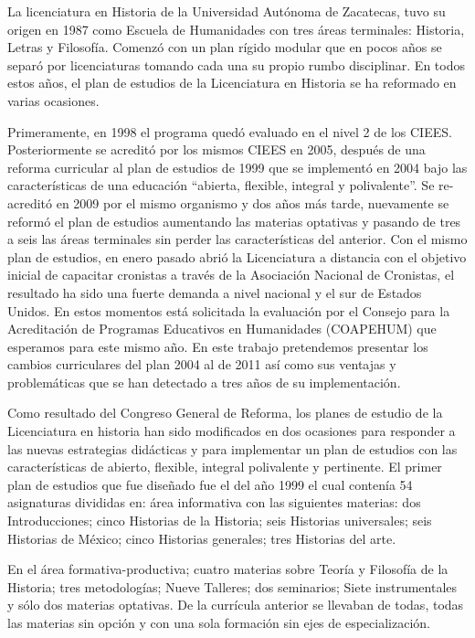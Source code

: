 \bigskip 
La licenciatura en Historia de la Universidad Autónoma de 
Zacatecas, tuvo su origen en 1987 como Escuela de Humanidades con tres 
áreas terminales: Historia, Letras y Filosofía. Comenzó con un plan 
rígido modular que en pocos años se separó por licenciaturas tomando 
cada una su propio rumbo disciplinar. En todos estos años, el plan de 
estudios de la Licenciatura en Historia se ha reformado en varias 
ocasiones.

Primeramente, en 1998 el programa quedó evaluado en el nivel 2 de los 
CIEES. Posteriormente se acreditó por los mismos CIEES en 2005, después 
de una reforma curricular al plan de estudios de 1999 que se implementó 
en 2004 bajo las características de una educación “abierta, flexible, 
integral y polivalente”. Se re-acreditó en 2009 por el mismo organismo 
y dos años más tarde, nuevamente se reformó el plan de estudios 
aumentando las materias optativas y pasando de tres a seis las áreas 
terminales sin perder las características del anterior. Con el mismo 
plan de estudios, en enero pasado abrió la Licenciatura a distancia con 
el objetivo inicial de capacitar cronistas a través de la Asociación 
Nacional de Cronistas, el resultado ha sido una fuerte demanda a nivel 
nacional y el sur de Estados Unidos.  En estos momentos está solicitada 
la evaluación por el Consejo para la Acreditación de Programas 
Educativos en Humanidades (COAPEHUM) que esperamos para este mismo año. 
En este trabajo pretendemos presentar los cambios curriculares del plan 
2004 al de 2011 así como sus ventajas y problemáticas que se han 
detectado a tres años de su implementación. 


Como resultado del Congreso General de Reforma, los planes de estudio 
de la Licenciatura en historia han sido modificados en dos ocasiones 
para responder a las nuevas estrategias didácticas y para implementar 
un plan de estudios con las características de abierto, flexible, 
integral polivalente y pertinente. El primer plan de estudios que fue 
diseñado fue el del año 1999 el cual contenía 54 asignaturas divididas 
en: área informativa con las siguientes materias: dos Introducciones; 
cinco Historias de la Historia; seis Historias universales; seis 
Historias de México; cinco Historias generales; tres Historias del 
arte.

En el área formativa-productiva; cuatro materias sobre Teoría y 
Filosofía de la Historia; tres metodologías; Nueve Talleres; dos 
seminarios; Siete instrumentales y sólo dos materias optativas. De la 
currícula anterior se llevaban de todas, todas las materias sin opción 
y con una sola formación sin ejes de especialización. 


